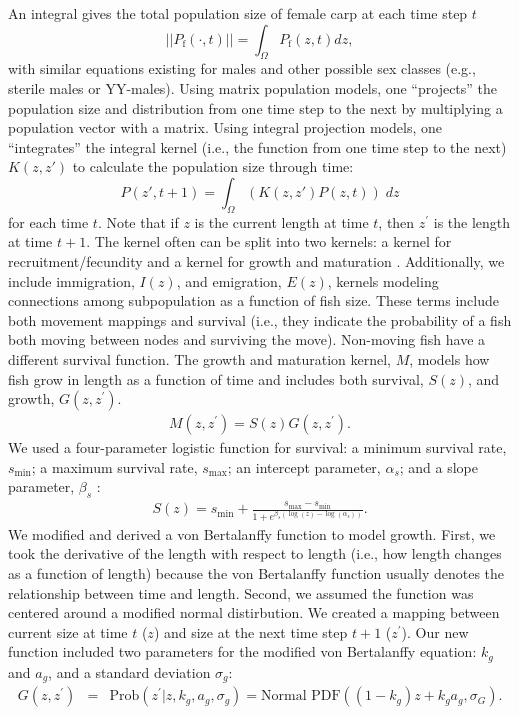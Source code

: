 \documentclass{article}[12pt]
\begin{document}
An integral gives the total population size of female carp at each time step \(t\)
\begin{equation*}
||P_{\text{f}}(\cdot, t)|| = \int_{\Omega}P_{\text{f}}(z, t) dz,
\end{equation*}
with similar equations existing for males and other possible sex classes (e.g., sterile males or YY-males).
Using matrix population models, one ``projects'' the population size and distribution from one time step to the next by multiplying a population vector with a matrix.
Using integral projection models, one ``integrates'' the integral kernel (i.e., the function from one time step to the next) \(K(z,z')\) to calculate the population size through time: 
\begin{equation*}
P(z', t+1) = \int_{\Omega} (K(z, z')P(z, t))\; dz
\end{equation*}
for each time \(t\). 
Note that if \(z\) is the current length at time \(t\), then \(z^\prime\) is the length at time \(t+1\).
The kernel often can be split into two kernels: a kernel for recruitment/fecundity and a kernel for growth and maturation \citep{ellner2006integral}.  
Additionally, we include immigration, \(I(z)\), and emigration, \(E(z)\), kernels modeling connections among subpopulation as a function of fish size.
These terms include both movement mappings and survival  (i.e., they indicate the probability of a fish both moving between nodes and surviving the move).
Non-moving fish have a different survival function.
The growth and maturation kernel, \(M\), models how fish grow in length as a function of time and includes both survival, \(S(z)\), and growth, \(G(z, z^\prime)\). 
\begin{eqnarray}
M(z, z^\prime) = S(z) G(z, z^\prime).\label{eqn:growMat}
\end{eqnarray}
We used a four-parameter logistic function for survival:
a minimum survival rate, \(s_\text{min}\); 
a maximum survival rate, \(s_\text{max}\);
an intercept parameter, \(\alpha_s\); and 
a slope parameter, \(\beta_s\) \citep{bolker2008ecological}:
\begin{eqnarray}
S(z) = s_\text{min} + \frac{s_\text{max} - s_\text{min}}{ 1 + e^{\beta_s (\log(z) - \log(\alpha_s))}} .
\end{eqnarray}
We modified and derived a von Bertalanffy function to model growth.
First, we took the derivative of the length with respect to length (i.e., how length changes as a function of length) because the von Bertalanffy function usually denotes the relationship between time and length.
Second, we assumed the function was centered around a modified normal distirbution. 
We created a mapping between current size at time \(t\) (\(z\)) and size at the next time step \(t+1\) (\(z^\prime\)).
Our new function included two parameters for the modified von Bertalanffy equation: \(k_g\) and \(a_g\), and a standard deviation \(\sigma_g\):
\begin{eqnarray}
G(z, z^\prime) &=&  \text{Prob}(z^\prime | z, k_g, a_g, \sigma_g) = \text{Normal PDF}((1 - k_g) z + k_g  a_g , \sigma_G).\label{eqn:Growth}
\end{eqnarray}
\end{document}
